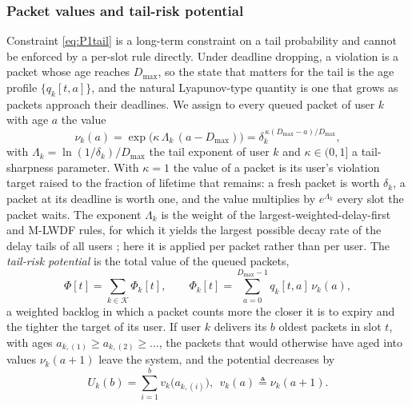 \documentclass[journal]{IEEEtran}
\newcommand{\Dmax}{D_{\max}}
\newcommand{\Kset}{\mathcal{K}}
\begin{document}
\subsubsection{Packet values and tail-risk potential}
Constraint \eqref{eq:P1tail} is a long-term constraint on a tail probability and cannot be enforced by a per-slot rule directly. Under deadline dropping, a violation is a packet whose age reaches $\Dmax$, so the state that matters for the tail is the age profile $\{q_k[t,a]\}$, and the natural Lyapunov-type quantity is one that grows as packets approach their deadlines. We assign to every queued packet of user $k$ with age $a$ the value
\begin{equation}\label{eq:nu}
\nu_k(a)=\exp\big(\kappa\,\Lambda_k\,(a-\Dmax)\big)=\delta_k^{\,\kappa(\Dmax-a)/\Dmax},
\end{equation}
with $\Lambda_k=\ln(1/\delta_k)/\Dmax$ the tail exponent of user $k$ and
$\kappa\in(0,1]$ a tail-sharpness parameter. With $\kappa=1$ the value of a packet is its user's violation target raised to the fraction of lifetime that remains: a fresh packet is worth $\delta_k$, a packet at its deadline is worth one, and the value multiplies by $e^{\Lambda_k}$ every slot the packet waits. The exponent $\Lambda_k$ is the weight of the largest-weighted-delay-first and M-LWDF rules, for which it yields the largest possible decay rate of the delay tails of all users \cite{Stolyar2001LWDF,Andrews2001}; here it is applied per packet rather than per user. The \emph{tail-risk potential} is the total value of the queued packets,
\begin{equation}\label{eq:Phi}
\Phi[t]=\sum_{k\in\Kset}\Phi_k[t],\qquad \Phi_k[t]=\sum_{a=0}^{\Dmax-1}q_k[t,a]\,\nu_k(a),
\end{equation}
a weighted backlog in which a packet counts more the closer it is to expiry and the tighter the target of its user. If user $k$ delivers its $b$ oldest packets in slot $t$, with ages $a_{k,(1)}\ge a_{k,(2)}\ge\dots$, the packets that would otherwise have aged into values $\nu_k(a+1)$ leave the system, and the potential decreases by
\begin{equation}\label{eq:U}
U_k(b)=\sum_{i=1}^{b}v_k\big(a_{k,(i)}\big),\ \ v_k(a)\triangleq\nu_k(a+1).
\end{equation}
\end{document}
